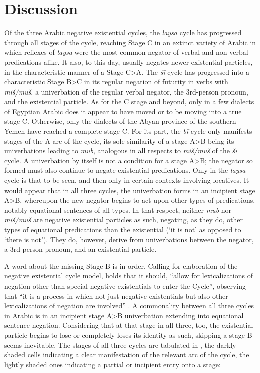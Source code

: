 \documentclass[output=paper]{langsci/langscibook}
\begin{document}
\section{Discussion} \label{s:WiAR-5}

Of the three Arabic negative existential cycles, the \textit{laysa} cycle has progressed through all stages of the cycle, reaching Stage C in an extinct variety of Arabic in which reflexes of \textit{laysa} were the most common negator of verbal and non-verbal predications alike. It also, to this day, usually negates newer existential particles, in the characteristic manner of a Stage C>A. The \textit{šī} cycle has progressed into a characteristic Stage B>C in its regular negation of futurity in verbs with \textit{miš/muš}, a univerbation of the regular verbal negator, the 3rd-person pronoun, and the existential particle. As for the C stage and beyond, only in a few dialects of Egyptian Arabic does it appear to have moved or to be moving into a true stage C. Otherwise, only the dialects of the Abyan province of the southern Yemen have reached a complete stage C. For its part, the \textit{bī} cycle only manifests stages of the A arc of the cycle, its sole similarity of a stage A>B being its univerbations leading to \textit{mub}, analogous in all respects to \textit{miš/muš} of the \textit{šī} cycle. A univerbation by itself is not a condition for a stage A>B; the negator so formed must also continue to negate existential predications. Only in the \textit{laysa} cycle is that to be seen, and then only in certain contexts involving locatives. It would appear that in all three cycles, the univerbation forms in an incipient stage A>B, whereupon the new negator begins to act upon other types of predications, notably equational sentences of all types. In that respect, neither \textit{mub} nor \textit{miš/muš} are negative existential particles as such, negating, as they do, other types of equational predications than the existential (‘it is not’ as opposed to ‘there is not’). They do, however, derive from univerbations between the negator, a 3rd-person pronoun, and an existential particle.

A word about the missing Stage B is in order. Calling for elaboration of the negative existential cycle model, \citet{Veselinova2014} holds that it should, “allow for lexicalizations of negation other than special negative existentials to enter the Cycle”, observing that “it is a process in which not just negative existentials but also other lexicalizations of negation are involved” \citeyearpar[1338, 1139]{Veselinova2014}. A commonality between all three cycles in Arabic is in an incipient stage A>B univerbation extending into equational sentence negation. Considering that at that stage in all three, too, the existential particle begins to lose or completely loses its identity as such, skipping a stage B seems inevitable. The stages of all three cycles are tabulated in , the darkly shaded cells indicating a clear manifestation of the relevant arc of the cycle, the lightly shaded ones indicating a partial or incipient entry onto a stage:%
\end{document}
